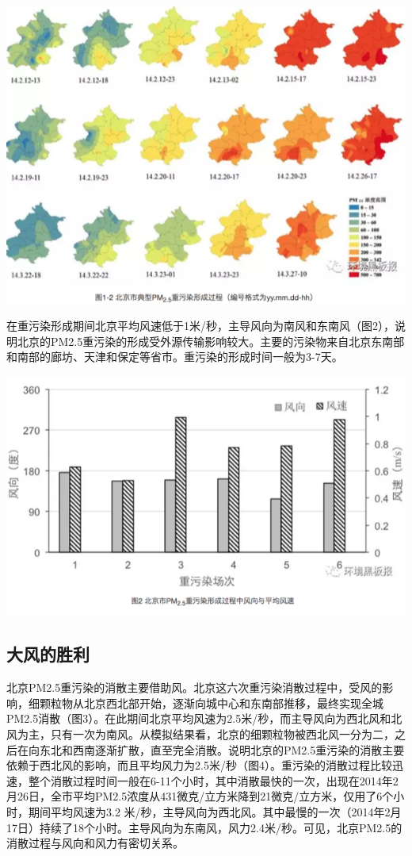 \documentclass[]{book}
\begin{document}
\includegraphics[width=8.33in]{images/windhaze2}

在重污染形成期间北京平均风速低于1米/秒，主导风向为南风和东南风（图2），说明北京的PM2.5重污染的形成受外源传输影响较大。主要的污染物来自北京东南部和南部的廊坊、天津和保定等省市。重污染的形成时间一般为3-7天。

\includegraphics[width=8.33in]{images/windhaze3}

\hypertarget{ux5927ux98ceux7684ux80dcux5229}{%
\subsection{大风的胜利}\label{ux5927ux98ceux7684ux80dcux5229}}

北京PM2.5重污染的消散主要借助风。北京这六次重污染消散过程中，受风的影响，细颗粒物从北京西北部开始，逐渐向城中心和东南部推移，最终实现全城PM2.5消散（图3）。在此期间北京平均风速为2.5米/秒，而主导风向为西北风和北风为主，只有一次为南风。从模拟结果看，北京的细颗粒物被西北风一分为二，之后在向东北和西南逐渐扩散，直至完全消散。说明北京的PM2.5重污染的消散主要依赖于西北风的影响，而且平均风力为2.5米/秒（图4）。重污染的消散过程比较迅速，整个消散过程时间一般在6-11个小时，其中消散最快的一次，出现在2014年2月26日，全市平均PM2.5浓度从431微克/立方米降到21微克/立方米，仅用了6个小时，期间平均风速为3.2 米/秒，主导风向为西北风。其中最慢的一次（2014年2月17日）持续了18个小时。主导风向为东南风，风力2.4米/秒。可见，北京PM2.5的消散过程与风向和风力有密切关系。
\end{document}

